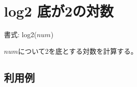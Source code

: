 
%

\section{log2 底が2の対数\label{sect:log2}}

書式: log2($num$)

$num$について2を底とする対数を計算する。

\subsection*{利用例}


%

